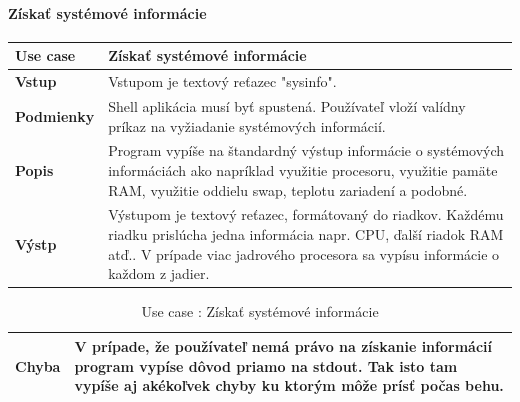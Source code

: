 \paragraph{Získať systémové informácie}
\begin{center}
	\begin{table}[htbp]
		\begin{tabular}{|p{2.5cm}|p{14cm}|}
			\hline
			\textbf{Use case} & Získať systémové informácie \\ 
			\hline
			\textbf{Vstup} & Vstupom je textový reťazec "sysinfo".\\
			\hline
			\textbf{Podmienky} & Shell aplikácia musí byť spustená. Používateľ vloží valídny príkaz na vyžiadanie systémových informácií. \\ 
			\hline
			\textbf{Popis} & Program vypíše na štandardný výstup informácie o systémových informáciách ako napríklad využitie procesoru, využitie pamäte RAM, využitie oddielu swap, teplotu zariadení a podobné.\\ 
			\hline
					
			\textbf{Výstp} & Výstupom je textový reťazec, formátovaný do riadkov. Každému riadku prislúcha jedna informácia napr. CPU, ďalší riadok RAM atď.. V prípade viac jadrového procesora sa vypísu informácie o každom z jadier.  \\
			\hline
		\end{tabular}
	\end{table}
\newpage
\begin{table}[htbp]
\begin{tabular}{|p{2.5cm}|p{14cm}|}
\hline
			\textbf{Chyba} & V prípade, že používateľ nemá právo na získanie informácií program vypíse dôvod priamo na stdout. Tak isto tam vypíše aj akékoľvek chyby ku ktorým môže prísť počas behu.\\
			\hline
		\end{tabular}
		\label{table:1}
		\caption{Use case : Získať systémové informácie}
	\end{table}
\end{center}

